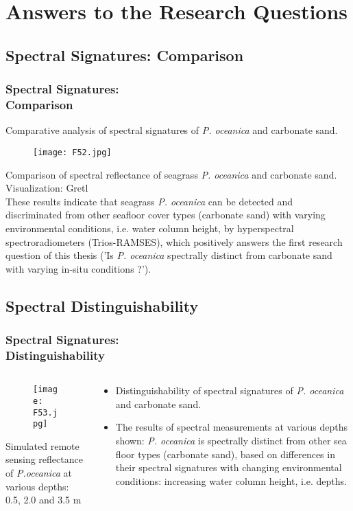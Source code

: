 \documentclass[pdflatex,compress,9pt,
	xcolor={dvipsnames,dvipsnames,svgnames,x11names,table},
	hyperref={colorlinks = true,breaklinks = true, urlcolor = NavyBlue, breaklinks = true}]{beamer}
\begin{document}
\section{Answers to the Research Questions}

\subsection{Spectral Signatures: Comparison}
\begin{frame}\frametitle{Spectral Signatures: \\Comparison}
\scriptsize{Comparative analysis of spectral signatures of \emph{P. oceanica} and carbonate sand.} 
\begin{figure}[H]
	\centering
		\texttt{[image: F52.jpg]}
\end{figure}
\scriptsize{Comparison of spectral reflectance of seagrass \emph{P. oceanica} and carbonate sand. Visualization: \ac{Gretl}}\\
\footnotesize{These results indicate that seagrass \emph{P. oceanica} can be detected and discriminated from other seafloor cover types (carbonate sand) with varying environmental conditions, i.e. water column height, by hyperspectral spectroradiometers (\ac{Trios-RAMSES}), which positively answers the first research question of this thesis ('Is \emph{P. oceanica} spectrally distinct from carbonate sand with varying in-situ conditions ?').}
\end{frame}

\subsection{Spectral Distinguishability}
\begin{frame}\frametitle{Spectral Signatures: \\Distinguishability}
\begin{minipage}[0.4\textheight]{\textwidth}
\begin{columns}[T]
\begin{column}{0.6\textwidth}
\begin{figure}[H]
	\centering
		\texttt{[image: F53.jpg]}
\end{figure}
\tiny{Simulated remote sensing reflectance of \emph{P.oceanica} at various depths: 0.5, 2.0 and 3.5 m}
\end{column}
\begin{column}{0.4\textwidth}
\small{\begin{itemize}
	\item Distinguishability of spectral signatures of \emph{P. oceanica} and carbonate sand. 
	\item The results of spectral measurements at various depths shown: \emph{P. oceanica} is spectrally distinct from other sea floor types (carbonate sand), based on differences in their spectral signatures with changing environmental conditions: increasing water column height, i.e. depths.
\end{itemize}}
\end{column}
\end{columns}
\end{minipage}
\end{frame}
\end{document}
